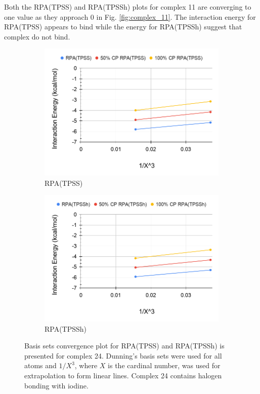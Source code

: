 \documentclass[11pt]{article}
\begin{document}
Both the RPA(TPSS) and RPA(TPSSh) plots for complex 11 are converging
to one value as they approach 0 in Fig. \ref{fig:complex_11}. The
interaction energy for RPA(TPSS) appears to bind while the energy
for RPA(TPSSh) suggest that complex do not bind.

\begin{figure}[H]
  \centering
  \begin{subfigure}{.5\textwidth}
    \centering
    \includegraphics[scale=0.3]{tpss-24.png}
    \caption{RPA(TPSS)}
    \label{fig:tpss_24}
  \end{subfigure}%
  \begin{subfigure}{.5\textwidth}
    \centering
    \includegraphics[scale=0.3]{tpssh-24.png}
    \caption{RPA(TPSSh)}
    \label{fig:tpssh_24}
  \end{subfigure}
  \caption{Basis sets convergence plot for RPA(TPSS) and RPA(TPSSh) is
    presented for complex 24. Dunning's basis sets were used for all
    atoms and $1/X^3$, where $X$ is the cardinal number, was used for
    extrapolation to form linear lines. Complex 24 contains halogen 
    bonding with iodine.}
  \label{fig:complex_24}
\end{figure}
\end{document}
